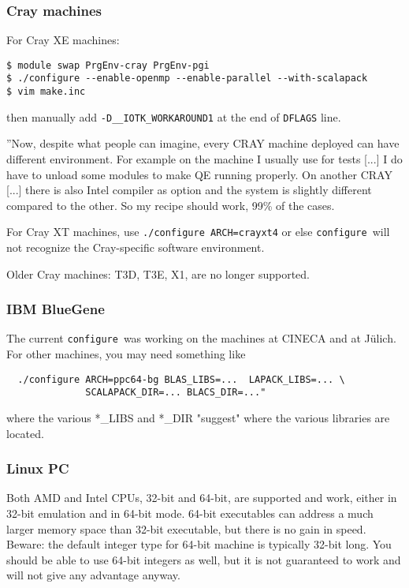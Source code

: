\documentclass[12pt,a4paper]{article}
\def\configure{\texttt{configure}}
\begin{document}
\subsubsection{Cray machines}

For Cray XE machines:
\begin{verbatim}
$ module swap PrgEnv-cray PrgEnv-pgi
$ ./configure --enable-openmp --enable-parallel --with-scalapack
$ vim make.inc
\end{verbatim}
then manually add \texttt{-D\_\_IOTK\_WORKAROUND1} at the end of \texttt{DFLAGS} line.

''Now, despite what people can imagine, every CRAY machine deployed can
have different environment. For example on the machine I usually use
for tests [...] I do have to unload some modules to make QE running
properly. On another CRAY [...] there is also Intel compiler as option
and the system is slightly different compared to the other.
So my recipe should work, 99\% of the cases.

For Cray XT machines, use \texttt{./configure ARCH=crayxt4} or else
\configure\ will not recognize the Cray-specific software environment.

Older Cray machines: T3D, T3E, X1, are no longer supported.

\subsubsection{IBM BlueGene}

The current \configure\ was working on the machines at CINECA and at J\"ulich.
For other machines, you may need something like
\begin{verbatim}
  ./configure ARCH=ppc64-bg BLAS_LIBS=...  LAPACK_LIBS=... \
              SCALAPACK_DIR=... BLACS_DIR=..."
\end{verbatim}
where the various *\_LIBS and *\_DIR "suggest" where the various libraries
are located.

\subsubsection{Linux PC}

Both AMD and Intel CPUs, 32-bit and 64-bit, are supported and work,
either in 32-bit emulation and in 64-bit mode. 64-bit executables
can address a much larger memory space than 32-bit executable, but
there is no gain in speed.
Beware: the default integer type for 64-bit machine is typically
32-bit long. You should be able to use 64-bit integers as well,
but it is not guaranteed to work and will not give
any advantage anyway.
\end{document}
